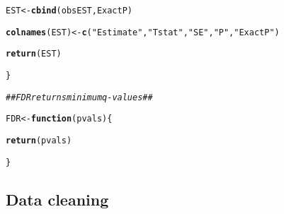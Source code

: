 \documentclass[11pt, a4paper]{article}\usepackage[]{graphicx}\usepackage[]{color}
\makeatletter
\newcommand{\hlstr}[1]{\textcolor[rgb]{0.192,0.494,0.8}{#1}}%
\newcommand{\hlcom}[1]{\textcolor[rgb]{0.678,0.584,0.686}{\textit{#1}}}%
\newcommand{\hlstd}[1]{\textcolor[rgb]{0.345,0.345,0.345}{#1}}%
\newcommand{\hlkwa}[1]{\textcolor[rgb]{0.161,0.373,0.58}{\textbf{#1}}}%
\newcommand{\hlkwb}[1]{\textcolor[rgb]{0.69,0.353,0.396}{#1}}%
\newcommand{\hlkwc}[1]{\textcolor[rgb]{0.333,0.667,0.333}{#1}}%
\newcommand{\hlkwd}[1]{\textcolor[rgb]{0.737,0.353,0.396}{\textbf{#1}}}%
\newenvironment{kframe}{%
 \def\at@end@of@kframe{}%
 \ifinner\ifhmode%
  \def\at@end@of@kframe{\end{minipage}}%
  \begin{minipage}{\columnwidth}%
 \fi\fi%
 \def\FrameCommand##1{\hskip\@totalleftmargin \hskip-\fboxsep
 \colorbox{shadecolor}{##1}\hskip-\fboxsep
     \hskip-\linewidth \hskip-\@totalleftmargin \hskip\columnwidth}%
 \MakeFramed {\advance\hsize-\width
   \@totalleftmargin\z@ \linewidth\hsize
   \@setminipage}}%
 {\par\unskip\endMakeFramed%
 \at@end@of@kframe}
\newenvironment{knitrout}{}{} %
\makeatother
\begin{document}
\begin{knitrout}
\begin{kframe}
\begin{alltt}
        \hlstd{EST} \hlkwb{<-} \hlkwd{cbind}\hlstd{(obsEST, ExactP)}

        \hlkwd{colnames}\hlstd{(EST)} \hlkwb{<-} \hlkwd{c}\hlstd{(}\hlstr{"Estimate"}\hlstd{,} \hlstr{"Tstat"}\hlstd{,} \hlstr{"SE"}\hlstd{,} \hlstr{"P"}\hlstd{,} \hlstr{"ExactP"}\hlstd{)}

        \hlkwd{return}\hlstd{(EST)}

    \hlstd{\}}

    \hlcom{## FDR returns minimum q-values ##}

    \hlstd{FDR} \hlkwb{<-} \hlkwa{function}\hlstd{(}\hlkwc{pvals}\hlstd{) \{}

        \hlkwd{return}\hlstd{(pvals)}

    \hlstd{\}}
\end{alltt}
\end{kframe}
\end{knitrout}
    \subsection{Data cleaning}
\end{document}
